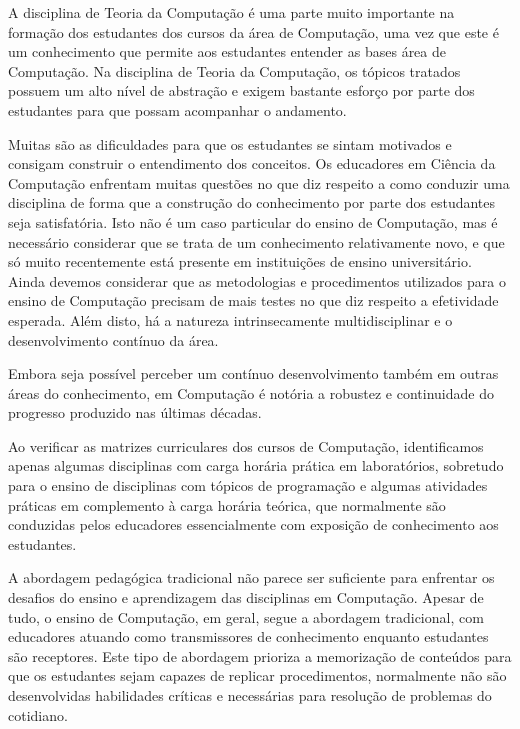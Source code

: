 \newcommand{\publicacaoTemplate}[2]{%
\textbf{#1} : #2}


\acresetall
\label{cap-introducao}
A disciplina de Teoria da Computação é uma parte muito importante
na formação dos estudantes dos cursos da área de Computação, uma 
vez que este é um conhecimento que permite aos estudantes
entender as bases área de Computação.
Na disciplina de Teoria da Computação, os tópicos tratados
possuem um alto nível de abstração e exigem bastante esforço
por parte dos estudantes para que possam acompanhar o
andamento.

Muitas são as dificuldades para que os estudantes se sintam
motivados e consigam construir o entendimento dos conceitos.
Os educadores em Ciência da Computação enfrentam muitas questões no que diz
respeito a como conduzir uma disciplina de forma que a construção do conhecimento
por parte dos estudantes seja satisfatória.
Isto não é um caso particular do ensino de Computação,
mas é necessário considerar que se trata de um
conhecimento relativamente novo, e que só muito
recentemente está presente em instituições de ensino universitário.
Ainda devemos considerar que as metodologias e procedimentos utilizados
para o ensino de Computação precisam de mais testes no que diz respeito
a efetividade esperada.
Além disto, há a natureza intrinsecamente multidisciplinar e
o desenvolvimento contínuo da área.

Embora seja possível perceber um contínuo desenvolvimento também em
outras áreas do conhecimento, em Computação é notória a robustez e
continuidade do progresso produzido nas últimas décadas.



Ao verificar as matrizes curriculares dos cursos de Computação,
identificamos apenas algumas disciplinas com carga horária prática
em laboratórios, sobretudo para o ensino de disciplinas com
tópicos de programação e algumas atividades práticas em
complemento à carga horária teórica,
que normalmente são conduzidas pelos educadores essencialmente com
exposição de conhecimento aos estudantes.

A abordagem pedagógica tradicional não parece ser suficiente para enfrentar
os desafios do ensino e aprendizagem das disciplinas
em Computação.
Apesar de tudo, o ensino de Computação, em geral, segue a abordagem
tradicional, com educadores atuando como transmissores de conhecimento
enquanto estudantes são receptores.
Este tipo de abordagem prioriza a memorização de conteúdos para
que os estudantes sejam capazes de replicar procedimentos,
normalmente não são desenvolvidas habilidades críticas e
necessárias para resolução de problemas do cotidiano.

